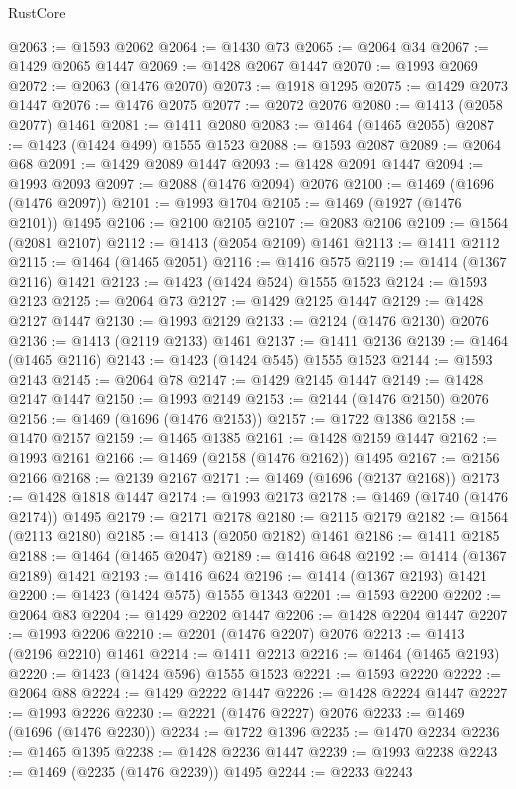 \begin{lexlean}{RustCore}
\begin{coremodule}
@2063 := @1593 @2062
@2064 := @1430 @73
@2065 := @2064 @34
@2067 := @1429 @2065 @1447
@2069 := @1428 @2067 @1447
@2070 := @1993 @2069
@2072 := @2063 (@1476 @2070)
@2073 := @1918 @1295
@2075 := @1429 @2073 @1447
@2076 := @1476 @2075
@2077 := @2072 @2076
@2080 := @1413 (@2058 @2077) @1461
@2081 := @1411 @2080
@2083 := @1464 (@1465 @2055)
@2087 := @1423 (@1424 @499) @1555 @1523
@2088 := @1593 @2087
@2089 := @2064 @68
@2091 := @1429 @2089 @1447
@2093 := @1428 @2091 @1447
@2094 := @1993 @2093
@2097 := @2088 (@1476 @2094) @2076
@2100 := @1469 (@1696 (@1476 @2097))
@2101 := @1993 @1704
@2105 := @1469 (@1927 (@1476 @2101)) @1495
@2106 := @2100 @2105
@2107 := @2083 @2106
@2109 := @1564 (@2081 @2107)
@2112 := @1413 (@2054 @2109) @1461
@2113 := @1411 @2112
@2115 := @1464 (@1465 @2051)
@2116 := @1416 @575
@2119 := @1414 (@1367 @2116) @1421
@2123 := @1423 (@1424 @524) @1555 @1523
@2124 := @1593 @2123
@2125 := @2064 @73
@2127 := @1429 @2125 @1447
@2129 := @1428 @2127 @1447
@2130 := @1993 @2129
@2133 := @2124 (@1476 @2130) @2076
@2136 := @1413 (@2119 @2133) @1461
@2137 := @1411 @2136
@2139 := @1464 (@1465 @2116)
@2143 := @1423 (@1424 @545) @1555 @1523
@2144 := @1593 @2143
@2145 := @2064 @78
@2147 := @1429 @2145 @1447
@2149 := @1428 @2147 @1447
@2150 := @1993 @2149
@2153 := @2144 (@1476 @2150) @2076
@2156 := @1469 (@1696 (@1476 @2153))
@2157 := @1722 @1386
@2158 := @1470 @2157
@2159 := @1465 @1385
@2161 := @1428 @2159 @1447
@2162 := @1993 @2161
@2166 := @1469 (@2158 (@1476 @2162)) @1495
@2167 := @2156 @2166
@2168 := @2139 @2167
@2171 := @1469 (@1696 (@2137 @2168))
@2173 := @1428 @1818 @1447
@2174 := @1993 @2173
@2178 := @1469 (@1740 (@1476 @2174)) @1495
@2179 := @2171 @2178
@2180 := @2115 @2179
@2182 := @1564 (@2113 @2180)
@2185 := @1413 (@2050 @2182) @1461
@2186 := @1411 @2185
@2188 := @1464 (@1465 @2047)
@2189 := @1416 @648
@2192 := @1414 (@1367 @2189) @1421
@2193 := @1416 @624
@2196 := @1414 (@1367 @2193) @1421
@2200 := @1423 (@1424 @575) @1555 @1343
@2201 := @1593 @2200
@2202 := @2064 @83
@2204 := @1429 @2202 @1447
@2206 := @1428 @2204 @1447
@2207 := @1993 @2206
@2210 := @2201 (@1476 @2207) @2076
@2213 := @1413 (@2196 @2210) @1461
@2214 := @1411 @2213
@2216 := @1464 (@1465 @2193)
@2220 := @1423 (@1424 @596) @1555 @1523
@2221 := @1593 @2220
@2222 := @2064 @88
@2224 := @1429 @2222 @1447
@2226 := @1428 @2224 @1447
@2227 := @1993 @2226
@2230 := @2221 (@1476 @2227) @2076
@2233 := @1469 (@1696 (@1476 @2230))
@2234 := @1722 @1396
@2235 := @1470 @2234
@2236 := @1465 @1395
@2238 := @1428 @2236 @1447
@2239 := @1993 @2238
@2243 := @1469 (@2235 (@1476 @2239)) @1495
@2244 := @2233 @2243

\end{coremodule}
\end{lexlean}
